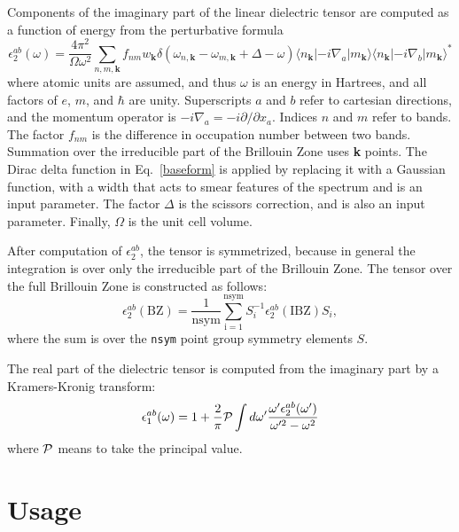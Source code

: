 \documentclass[prb,byrevtex]{revtex4}
\begin{document}
Components of the imaginary part of the linear dielectric tensor are
computed as a function of energy from the perturbative formula\cite{Gajdos:06}
\begin{equation}
\label{baseform}
\epsilon_2^{ab}(\omega) = \frac{4\pi^2}{\Omega\omega^2}\sum_{n,m,\mathbf{k}} f_{nm}w_{\mathbf{k}}
\delta(\omega_{n,\mathbf{k}}-\omega_{m,\mathbf{k}}+\Delta-\omega) 
\langle n_{\mathbf{k}}|-i\nabla_a|m_{\mathbf{k}}\rangle\langle n_{\mathbf{k}}|-i\nabla_b|m_{\mathbf{k}}\rangle^\ast
\end{equation}
where atomic units are assumed, and thus $\omega$ is an energy in Hartrees,
and all factors of $e$, $m$, and $\hbar$ are unity.  Superscripts $a$
and $b$ refer to cartesian directions, and the momentum operator is $-i\nabla_a =
-i \partial/\partial x_a$. Indices $n$ and $m$ refer to bands. The factor
$f_{nm}$ is the difference in occupation number between two bands. Summation over
the irreducible part of the Brillouin Zone uses 
{\bf k} points. The Dirac delta function
in Eq.~\ref{baseform} is applied by replacing it with a Gaussian function, with
a width that acts to smear features of the spectrum and is an input parameter. 
The factor $\Delta$ is the scissors correction,\cite{Levine:89} and is also an
input parameter. Finally, $\Omega$ is the unit cell volume.


After computation
of $\epsilon_2^{ab}$, the tensor is symmetrized, because in general the
integration is over only the irreducible part of the Brillouin Zone. The
tensor over the full Brillouin Zone is constructed as follows:
\begin{equation}
\epsilon_2^{ab}({\mathrm{BZ}}) = \frac{1}{\mathrm{nsym}} \sum_{\mathrm{i=1}}^{\mathrm{nsym}}S_i^{-1}\epsilon_2^{ab}({\mathrm{IBZ}})S_i,
\end{equation}
where the sum is over the {\tt nsym} point group symmetry elements $S$. 

The real part of the dielectric tensor is computed from the imaginary part
by a Kramers-Kronig transform:
\begin{equation}
\epsilon_1^{ab}(\omega) = 1 + \frac{2}{\pi}{\cal P}\int d\omega' \frac{\omega' \epsilon_2^{ab}(\omega')}{\omega'^2-\omega^2}
\end{equation}
where ${\cal P}$ means to take the principal value.

\section{Usage}
\end{document}
